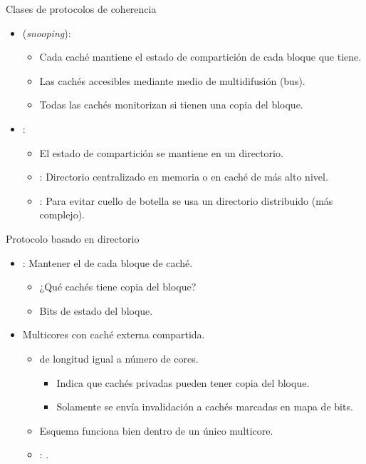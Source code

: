 \begin{frame}[t]{Clases de protocolos de coherencia}
\begin{itemize}
  \item {} (\emph{snooping}):
    \begin{itemize}
      \item Cada caché mantiene el estado de compartición de cada bloque que tiene.
      \item Las cachés accesibles mediante medio de multidifusión (bus).
      \item Todas las cachés monitorizan si tienen una copia del bloque.
    \end{itemize}

  \item {}:
    \begin{itemize}
      \item El estado de compartición se mantiene en un directorio.
        \item {}: 
              Directorio centralizado en memoria o en caché de más alto nivel.
        \item {}: 
              Para evitar cuello de botella se usa un directorio distribuido (más complejo).
    \end{itemize}
\end{itemize}
\end{frame}

\begin{frame}[t]{Protocolo basado en directorio}
\begin{itemize}
  \item {}: Mantener el  de cada bloque de caché.
    \begin{itemize}
      \item ¿Qué cachés tiene copia del bloque?
      \item Bits de estado del bloque.
    \end{itemize}

  \item Multicores con caché externa compartida.
    \begin{itemize}
      \item {} de longitud igual a número de cores.
        \begin{itemize}
          \item Indica que cachés privadas pueden tener copia del bloque.
          \item Solamente se envía invalidación a cachés marcadas en mapa de bits.
        \end{itemize}
      \item Esquema funciona bien dentro de un único multicore.
      \item {}: .
    \end{itemize}
\end{itemize}
\end{frame}

